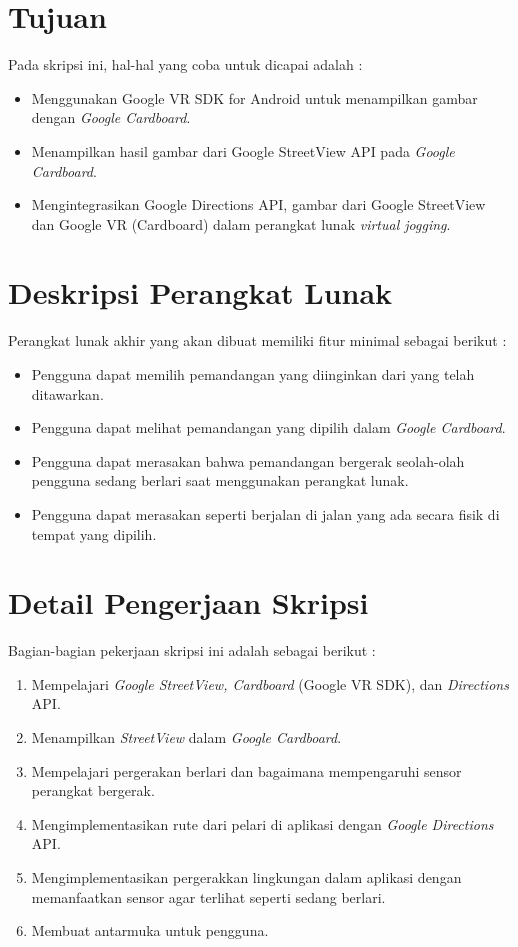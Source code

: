 \documentclass[a4paper,twoside]{article}
\begin{document}
\section{Tujuan}
Pada skripsi ini, hal-hal yang coba untuk dicapai adalah :
\begin{itemize}
	\item Menggunakan Google VR SDK for Android untuk menampilkan gambar dengan {\it Google Cardboard}.
	\item Menampilkan hasil gambar dari Google StreetView API pada {\it Google Cardboard}.
	\item Mengintegrasikan Google Directions API, gambar dari Google StreetView dan Google VR (Cardboard) dalam perangkat lunak {\it virtual jogging}.
\end{itemize}



\section{Deskripsi Perangkat Lunak}
Perangkat lunak akhir yang akan dibuat memiliki fitur minimal sebagai berikut :
\begin{itemize}
	\item Pengguna dapat memilih pemandangan yang diinginkan dari yang telah ditawarkan.
	\item Pengguna dapat melihat pemandangan yang dipilih dalam {\it Google Cardboard}.
	\item Pengguna dapat merasakan bahwa pemandangan bergerak seolah-olah pengguna sedang berlari saat menggunakan perangkat lunak.
	\item Pengguna dapat merasakan seperti berjalan di jalan yang ada secara fisik di tempat yang dipilih.
\end{itemize}

\section{Detail Pengerjaan Skripsi}
Bagian-bagian pekerjaan skripsi ini adalah sebagai berikut :
\begin{enumerate}
	\item Mempelajari {\it Google StreetView, Cardboard} (Google VR SDK), dan {\it Directions}  API.
	\item Menampilkan {\it StreetView} dalam {\it Google Cardboard}.
	\item Mempelajari pergerakan berlari dan bagaimana mempengaruhi sensor perangkat bergerak. 
	\item Mengimplementasikan rute dari pelari di aplikasi dengan {\it Google Directions} API.
	\item Mengimplementasikan pergerakkan lingkungan dalam aplikasi dengan memanfaatkan sensor agar terlihat seperti sedang berlari.
	\item Membuat antarmuka untuk pengguna.
\end{enumerate}
\end{document}
